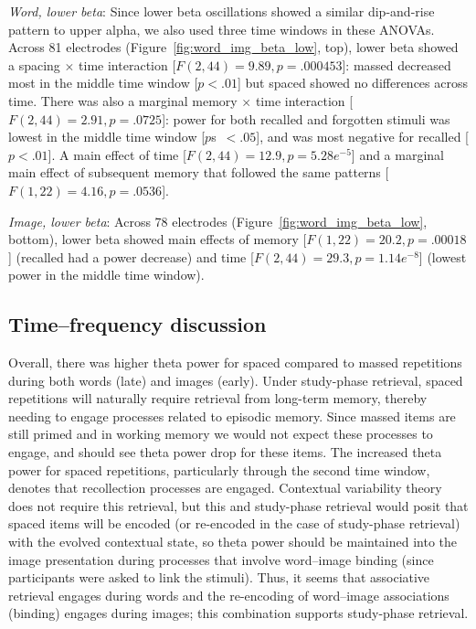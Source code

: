 \textit{Word, lower beta}:  Since lower beta oscillations showed a similar dip-and-rise pattern to upper alpha, we also used three time windows in these ANOVAs.  Across 81 electrodes (Figure~\ref{fig:word_img_beta_low}, top), lower beta showed a spacing $\times$ time interaction [$F(2,44)=9.89, p=.000453$]: massed decreased most in the middle time window [$p<.01$] but spaced showed no differences across time.  There was also a marginal memory $\times$ time interaction [$F(2,44)=2.91, p=.0725$]: power for both recalled and forgotten stimuli was lowest in the middle time window [$p$s~$<.05$], and was most negative for recalled [$p<.01$].
A main effect of time [$F(2,44)=12.9, p=5.28e^{-5}$] and a marginal main effect of subsequent memory that followed the same patterns [$F(1,22)=4.16, p=.0536$].

\textit{Image, lower beta}: Across 78 electrodes (Figure~\ref{fig:word_img_beta_low}, bottom), lower beta showed main effects of memory [$F(1,22)=20.2, p=.00018$] (recalled had a power decrease) and time [$F(2,44)=29.3, p=1.14e^{-8}$] (lowest power in the middle time window).


\subsection{Time--frequency discussion}


Overall, there was higher theta power for spaced compared to massed repetitions during both words (late) and images (early).
Under study-phase retrieval, spaced repetitions will naturally require retrieval from long-term memory, thereby needing to engage processes related to episodic memory.  Since massed items are still primed and in working memory we would not expect these processes to engage, and should see theta power drop for these items.
The increased theta power for spaced repetitions, particularly through the second time window, denotes that recollection processes are engaged.  Contextual variability theory does not require this retrieval, but this and study-phase retrieval would posit that spaced items will be encoded (or re-encoded in the case of study-phase retrieval) with the evolved contextual state, so theta power should be maintained into the image presentation during processes that involve word--image binding (since participants were asked to link the stimuli).
Thus, it seems that associative retrieval engages during words and the re-encoding of word--image associations (binding) engages during images; this combination supports study-phase retrieval.

